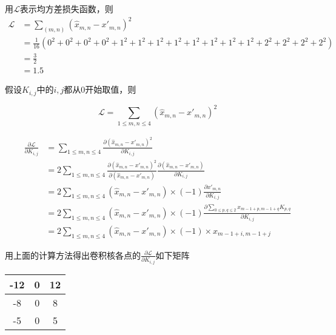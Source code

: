 \documentclass[12pt,AutoFakeBold]{article}
\begin{document}
    用\(\mathcal{L}\)表示均方差损失函数，则
    \begin{equation}
        \begin{split}
            \mathcal{L} &= \sum_{(m,n)} (\hat{x}_{m,n} - {x'}_{m,n})^2\\
            &= \frac{1}{16}\left(0^2 + 0^2 + 0^2 + 0^2 + 1^2 + 1^2 +1^2 +1^2 +1^2 + 1^2 +1^2 +1^2 + 2^2 + 2^2 + 2^2 + 2^2 \right)\\
            &= \frac{3}{2}\\
            &= 1.5
        \end{split}
    \end{equation}

    假设\(K_{i,j}\)中的\(i,j\)都从0开始取值，则

    \begin{equation}
        \mathcal{L} = \sum_{1 \leq m,n \leq 4} (\hat{x}_{m,n} - {x'}_{m,n})^2
    \end{equation}

    \begin{equation}
        \begin{split}
            \frac{\partial \mathcal{L}}{\partial K_{i,j}} &= \sum_{1\leq m,n \leq 4} \frac{\partial \left(\hat{x}_{m,n} - {x'}_{m,n}\right)^2}{\partial K_{i,j}}\\
            &= 2\sum_{1\leq m,n \leq 4} \frac{\partial \left(\hat{x}_{m,n} - {x'}_{m,n}\right)^2}{\partial \left(\hat{x}_{m,n} - {x'}_{m,n}\right)}\frac{\partial \left(\hat{x}_{m,n} - {x'}_{m,n}\right)}{\partial K_{i,j}}\\
            &= 2\sum_{1\leq m,n \leq 4} \left(\hat{x}_{m,n} - {x'}_{m,n}\right)\times (-1)\frac{\partial {x'}_{m,n}}{\partial K_{i,j}}\\
            &= 2\sum_{1\leq m,n \leq 4} \left(\hat{x}_{m,n} - {x'}_{m,n}\right)\times (-1)\frac{\partial \sum_{0 \leq p,q\leq 2} x_{m-1+p,m-1+q}K_{p,q}}{\partial K_{i,j}}\\
            &= 2\sum_{1\leq m,n \leq 4} \left(\hat{x}_{m,n} - {x'}_{m,n}\right)\times (-1)\times x_{m-1+i,m-1+j}
        \end{split}
    \end{equation}

    用上面的计算方法得出卷积核各点的\(\frac{\partial \mathcal{L}}{\partial K_{i,j}}\)如下矩阵

    \begin{center}
        \begin{tabular}{|c|c|c|}
            \hline
            -12&0&12\\
            \hline
            -8&0&8\\
            \hline
            -5&0&5\\
            \hline
        \end{tabular}
    \end{center}
\end{document}
